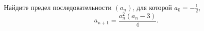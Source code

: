 \documentclass{article}
\begin{document}
Найдите предел последовательности $(a_n)$, для которой $a_0=-\frac12$,
$$a_{n+1}=\frac{a^2_n (a_n-3)}{4}.$$
\end{document}
